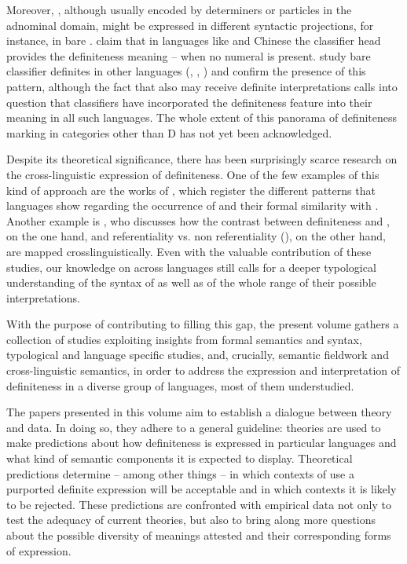 \documentclass[output=paper]{langsci/langscibook}
\begin{document}
Moreover, , although usually encoded by determiners or particles in the adnominal domain, might be expressed in different syntactic projections, for instance, in bare . \citet{ChengSybesma1999} claim that in languages like  and  Chinese the classifier head provides the definiteness meaning -- when no numeral is present. \citet{SimpsonEtAlii2011} study bare classifier definites in other languages (, , ) and confirm the presence of this pattern, although the fact that also  may receive definite interpretations calls into question that classifiers have incorporated the definiteness feature into their meaning in all such languages. The whole extent of this panorama of definiteness marking in categories other than D has not yet been acknowledged.

Despite its theoretical significance, there has been surprisingly scarce research on the cross-linguistic  expression of definiteness. One of the few examples of this kind of approach are the works of \citet{Dryer2005definiteart,Dryer2013,Dryer2014}, which register the different patterns that languages show regarding the occurrence of  and their formal similarity with . Another example is \citet{Givon1978}, who discusses how the contrast between definiteness and , on the one hand, and referentiality vs. non referentiality (), on the other hand, are mapped crosslinguistically. Even with the valuable contribution of these studies, our knowledge on  across languages still calls for a deeper typological understanding of the syntax of  as well as of the whole range of their possible interpretations. 

With the purpose of contributing to filling this gap, the present volume gathers a collection of studies exploiting insights from formal semantics and syntax, typological and language specific studies, and, crucially, semantic fieldwork and cross-linguistic semantics, in order to address the expression and interpretation of definiteness in a diverse group of languages, most of them understudied. 

The papers presented in this volume aim to establish a dialogue between theory and data. In doing so, they adhere to a general guideline:  theories are used to make predictions about how definiteness is expressed in particular languages and what kind of semantic components it is expected to display. Theoretical predictions determine -- among other things -- in which contexts of use a purported definite expression will be acceptable and in which contexts it is likely to be rejected. These predictions are confronted with empirical data not only to test the adequacy of current theories, but also to bring along more questions about the possible diversity of meanings attested and their corresponding forms of expression. 
\end{document}
